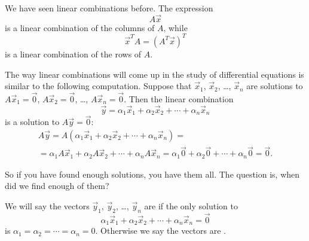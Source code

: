 We have seen linear combinations before.  The expression
\begin{equation*}
A \vec{x}
\end{equation*}
is a linear combination of the columns of $A$, while
\begin{equation*}
\vec{x}^T A = (A^T \vec{x})^T
\end{equation*}
is a linear combination of the rows of $A$.

The way linear combinations will come up in the study of differential
equations is similar to the following computation.  Suppose that
$\vec{x}_1$, $\vec{x}_2$, \ldots, $\vec{x}_n$ are solutions
to $A \vec{x}_1 = \vec{0}$, 
$A \vec{x}_2 = \vec{0}$, \ldots,
$A \vec{x}_n = \vec{0}$.
Then the linear combination
\begin{equation*}
\vec{y} = \alpha_1 \vec{x}_1 + 
\alpha_2 \vec{x}_2 + 
\cdots +
\alpha_n \vec{x}_n 
\end{equation*}
is a solution to $A \vec{y} = \vec{0}$:
\begin{multline*}
A \vec{y} =
A (\alpha_1 \vec{x}_1 + 
\alpha_2 \vec{x}_2 + 
\cdots +
\alpha_n \vec{x}_n )
=
\\
=
\alpha_1 A \vec{x}_1 + 
\alpha_2 A \vec{x}_2 + 
\cdots +
\alpha_n A \vec{x}_n
=
\alpha_1 \vec{0} + 
\alpha_2 \vec{0} + 
\cdots +
\alpha_n \vec{0} = \vec{0} .
\end{multline*}

So if you have found enough solutions, you have them all.  The question is,
when did we find enough of them?

We will say the vectors $\vec{y}_1$, $\vec{y}_2$, \ldots, $\vec{y}_n$ are
\emph{} if the only solution to
\begin{equation*}
\alpha_1 \vec{x}_1 + 
\alpha_2 \vec{x}_2 + 
\cdots +
\alpha_n \vec{x}_n 
=
\vec{0}
\end{equation*}
is $\alpha_1 = \alpha_2 = \cdots = \alpha_n = 0$.
Otherwise we say the vectors are \emph{}.


